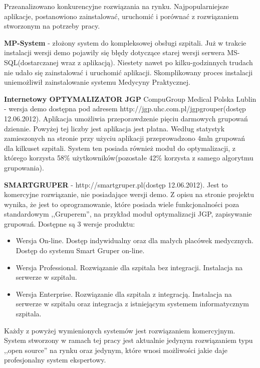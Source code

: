 Przeanalizowano konkurencyjne rozwiązania na rynku. Najpopularniejsze aplikacje, postanowiono zainstalować, uruchomić i porównać z rozwiązaniem stworzonym na potrzeby pracy. %

\textbf{MP-System} - złożony system do kompleksowej obsługi szpitali. Już w trakcie instalacji wersji demo pojawiły się błędy dotyczące starej wersji serwera MS-SQL(dostarczanej wraz z aplikacją). Niestety nawet po kilku-godzinnych trudach nie udało się zainstalować i uruchomić aplikacji. Skomplikowany proces instalacji uniemożliwił zainstalowanie systemu Medycyny Praktycznej.

\textbf{Internetowy OPTYMALIZATOR JGP} CompuGroup Medical Polska Lublin - wersja demo dostępna pod adresem http://jgp.uhc.com.pl/jgpgrouper(dostęp 12.06.2012).
Aplikacja umożliwia przeporawdzenie pięciu darmowych grupowań dziennie. Powyżej tej liczby jest aplikacja jest płatna. Według statystyk zamieszonych na stronie przy użyciu aplikacji przeprowadzono 4mln grupowań dla kilkuset szpitali.%
System ten posiada również moduł do optymalizacji, z którego korzysta 58\% użytkowników(pozostałe 42\% korzysta z samego algorytmu grupowania).

\textbf{SMARTGRUPER} - http://smartgruper.pl(dostęp 12.06.2012). Jest to komercyjne rozwiązanie, nie posiadające wersji demo. Z opisu na stronie projektu wynika, że jest to oprogramowanie, które posiada wiele funkcjonalności poza standardowym ,,Gruperem'', na przykład moduł optymalizacji JGP, zapisywanie grupowań. Dostępne są 3 wersje produktu:
\begin{itemize}
 \item Wersja On-line. Dostęp indywidualny oraz dla małych placówek medycznych. Dostęp do systemu Smart Gruper on-line.
 \item Wersja Professional. Rozwiązanie dla szpitala bez integracji. Instalacja na serwerze w szpitalu.
 \item Wersja Enterprise. Rozwiązanie dla szpitala z integracją. Instalacja na serwerze w szpitalu oraz integracja z istniejącym systemem informatycznym szpitala.
\end{itemize}

Każdy z powyżej wymienionych systemów jest rozwiązaniem komercyjnym. System stworzony w ramach tej pracy jest aktualnie jedynym rozwiązaniem typu ,,open source'' na rynku oraz jedynym, które wnosi możliwości jakie daje profesjonalny system ekspertowy.

